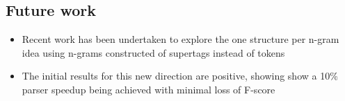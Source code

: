 \documentclass[landscape]{usydposter}
\newcommand{\ngram}{n-gram\xspace}
\newcommand{\ngrams}{{\ngram}s\xspace}
\begin{document}
\begin{multicols}{3}
\section{Future work}
\begin{itemize}
  \item Recent work has been undertaken to explore the one structure per \ngram idea using \ngrams constructed of supertags instead of tokens
  \item The initial results for this new direction are positive, showing show a 10\% parser speedup being achieved with minimal loss of F-score
\end{itemize}



\end{multicols}
\end{document}
